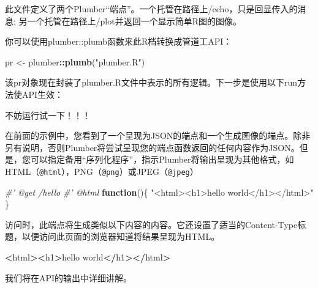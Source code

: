 \documentclass[]{book}
\newenvironment{Shaded}{\begin{snugshade}}{\end{snugshade}}
\newcommand{\KeywordTok}[1]{\textcolor[rgb]{0.13,0.29,0.53}{\textbf{#1}}}
\newcommand{\StringTok}[1]{\textcolor[rgb]{0.31,0.60,0.02}{#1}}
\newcommand{\CommentTok}[1]{\textcolor[rgb]{0.56,0.35,0.01}{\textit{#1}}}
\newcommand{\ControlFlowTok}[1]{\textcolor[rgb]{0.13,0.29,0.53}{\textbf{#1}}}
\newcommand{\OperatorTok}[1]{\textcolor[rgb]{0.81,0.36,0.00}{\textbf{#1}}}
\newcommand{\ErrorTok}[1]{\textcolor[rgb]{0.64,0.00,0.00}{\textbf{#1}}}
\newcommand{\NormalTok}[1]{#1}
\begin{document}
此文件定义了两个Plumber``端点''。一个托管在路径上/echo，只是回显传入的消息;
另一个托管在路径上/plot并返回一个显示简单R图的图像。

你可以使用plumber::plumb函数来此R档转换成管道工API：

\begin{Shaded}
\begin{Highlighting}[]
\NormalTok{pr <-}\StringTok{ }\NormalTok{plumber}\OperatorTok{::}\KeywordTok{plumb}\NormalTok{(}\StringTok{"plumber.R"}\NormalTok{)}
\end{Highlighting}
\end{Shaded}

该pr对象现在封装了plumber.R文件中表示的所有逻辑。下一步是使用以下run方法使API生效：

\begin{Shaded}
\end{Shaded}

不妨运行试一下！！！

在前面的示例中，您看到了一个呈现为JSON的端点和一个生成图像的端点。除非另有说明，否则Plumber将尝试呈现您的端点函数返回的任何内容作为JSON。但是，您可以指定备用``序列化程序''，指示Plumber将输出呈现为其他格式，如HTML（\texttt{@html}），PNG（\texttt{@png}）或JPEG（\texttt{@jpeg}）

\begin{Shaded}
\begin{Highlighting}[]
\CommentTok{#' @get /hello}
\CommentTok{#' @html}
\ControlFlowTok{function}\NormalTok{()\{}
  \StringTok{"<html><h1>hello world</h1></html>"}
\NormalTok{\}}
\end{Highlighting}
\end{Shaded}

访问时，此端点将生成类似以下内容的内容。它还设置了适当的Content-Type标题，以便访问此页面的浏览器知道将结果呈现为HTML。

\begin{Shaded}
\begin{Highlighting}[]
\OperatorTok{<}\NormalTok{html}\OperatorTok{>}\ErrorTok{<}\NormalTok{h1}\OperatorTok{>}\NormalTok{hello world}\OperatorTok{<}\ErrorTok{/}\NormalTok{h1}\OperatorTok{>}\ErrorTok{</}\NormalTok{html}\OperatorTok{>}
\end{Highlighting}
\end{Shaded}

我们将在API的输出中详细讲解。
\end{document}
